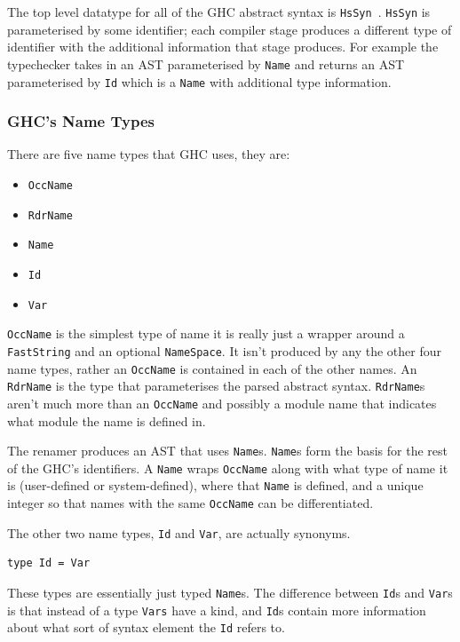 The top level datatype for all of the GHC abstract syntax is \texttt{HsSyn}~\citep{ghcDesign}. \texttt{HsSyn} is parameterised by some identifier; each compiler stage produces a different type of identifier with the additional information that stage produces. For example the typechecker takes in an AST parameterised by \texttt{Name} and returns an AST parameterised by \texttt{Id} which is a \texttt{Name} with additional type information.

\subsubsection{GHC's Name Types}

There are five name types that GHC uses, they are:

\begin{itemize}
	\item \texttt{OccName}
	\item \texttt{RdrName}
	\item \texttt{Name}
	\item \texttt{Id}
	\item \texttt{Var}
\end{itemize}

\texttt{OccName} is the simplest type of name it is really just a wrapper around a \texttt{FastString} and an optional \texttt{NameSpace}. It isn't produced by any the other four name types, rather an \texttt{OccName} is contained in each of the other names. An \texttt{RdrName} is the type that parameterises the parsed abstract  syntax. \texttt{RdrName}s aren't much more than an \texttt{OccName} and possibly a module name that indicates what module the name is defined in.

The renamer produces an AST that uses \texttt{Name}s. \texttt{Name}s form the basis for the rest of the GHC's identifiers. A \texttt{Name} wraps \texttt{OccName} along with what type of name it is (user-defined or system-defined), where that \texttt{Name} is defined, and a unique integer so that names with the same \texttt{OccName} can be differentiated. 

The other two name types, \texttt{Id} and \texttt{Var}, are actually synonyms.

\begin{lstlisting}[frame=single,caption={Id's definition from Var.hs in~\cite{ghcHackage}}]
type Id = Var
\end{lstlisting}

These types are essentially just typed \texttt{Name}s. The difference between \texttt{Id}s and \texttt{Var}s is that instead of a type \texttt{Vars} have a kind, and \texttt{Id}s contain more information about what sort of syntax element the \texttt{Id} refers to. 

